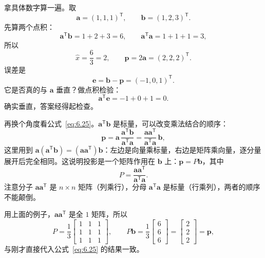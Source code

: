 \documentclass[UTF8,a4paper,12pt]{ctexart}
\numberwithin{equation}{section}
\newcommand{\trans}{^{\mathsf T}}
\begin{document}
	拿具体数字算一遍。取
	\begin{equation}\label{eq:6.26}
	\bm{a}=(1,1,1)\trans,
	\qquad
	\bm{b}=(1,2,3)\trans.
	\end{equation}
	先算两个点积：
	\begin{equation}\label{eq:6.27}
	\bm{a}\trans\bm{b}=1+2+3=6,
	\qquad
	\bm{a}\trans\bm{a}=1+1+1=3,
	\end{equation}
	所以
	\begin{equation}\label{eq:6.28}
	\hat{x}=\frac{6}{3}=2,
	\qquad
	\bm{p}=2\bm{a}=(2,2,2)\trans.
	\end{equation}
	误差是
	\begin{equation}\label{eq:6.29}
	\bm{e}=\bm{b}-\bm{p}=(-1,0,1)\trans.
	\end{equation}
	它是否真的与 $\bm{a}$ 垂直？做点积检验：
	\begin{equation}\label{eq:6.30}
	\bm{a}\trans\bm{e}=-1+0+1=0.
	\end{equation}
	确实垂直，答案经得起检查。

再换个角度看公式~\eqref{eq:6.25}。$\bm{a}\trans\bm{b}$ 是标量，可以改变乘法结合的顺序：
	\begin{equation}\label{eq:6.31}
	\bm{p}
	=\bm{a}\,\frac{\bm{a}\trans\bm{b}}{\bm{a}\trans\bm{a}}
	=\frac{\bm{a}\bm{a}\trans}{\bm{a}\trans\bm{a}}\,\bm{b},
	\end{equation}
	这里用到 $\bm{a}(\bm{a}\trans\bm{b})=(\bm{a}\bm{a}\trans)\bm{b}$：左边是向量乘标量，右边是矩阵乘向量，逐分量展开后完全相同。这说明投影是一个矩阵作用在 $\bm{b}$ 上：$\bm{p}=P\bm{b}$，其中
	\begin{equation}\label{eq:6.32}
	\boxed{P=\frac{\bm{a}\bm{a}\trans}{\bm{a}\trans\bm{a}}.}
	\end{equation}
	注意分子 $\bm{a}\bm{a}\trans$ 是 $n\times n$ 矩阵（列乘行），分母 $\bm{a}\trans\bm{a}$ 是标量（行乘列），两者的顺序不能颠倒。

	用上面的例子，$\bm{a}\bm{a}\trans$ 是全 $1$ 矩阵，所以
	\begin{equation}\label{eq:6.33}
	P=\frac{1}{3}
	\begin{bmatrix}
		1&1&1\\
		1&1&1\\
		1&1&1
	\end{bmatrix},
	\qquad
	P\bm{b}
	=\frac{1}{3}
	\begin{bmatrix}
		6\\
		6\\
		6
	\end{bmatrix}
	=
	\begin{bmatrix}
		2\\
		2\\
		2
	\end{bmatrix}
	=\bm{p},
	\end{equation}
与刚才直接代入公式~\eqref{eq:6.25} 的结果一致。
\end{document}
